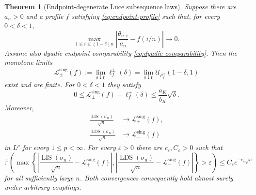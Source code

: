 \documentclass[11pt]{article}
\newtheorem{theorem}{Theorem}[section]
\theoremstyle{remark}
\newcommand{\Pp}{\mathbb P}
\newcommand{\LIS}{\operatorname{LIS}}
\newcommand{\LDS}{\operatorname{LDS}}
\newcommand{\eps}{\varepsilon}
\newcommand{\calL}{\mathcal L}
\newcommand{\calU}{\mathcal U}
\newcommand{\abs}[1]{\left|#1\right|}
\begin{document}
\begin{theorem}[Endpoint-degenerate Luce subsequence laws]
\label{thm:endpoint-luce}
Suppose there are $a_n>0$ and a profile $f$ satisfying
\eqref{eq:endpoint-profile} such that, for every $0<\delta<1$,
\begin{equation}\label{eq:interior-profile-conv}
 \max_{1\le i\le(1-\delta)n}
 \abs{\frac{\theta_{n,i}}{a_n}-f(i/n)}
 \longrightarrow0.
\end{equation}
Assume also dyadic endpoint comparability
\eqref{eq:dyadic-comparability}.  Then the monotone limits
\begin{equation}\label{eq:singular-L-def}
        \calL_\pm^{\mathrm{sing}}(f)
        :=\lim_{\delta\downarrow0}\ell_f^{\pm}(\delta)
        =\lim_{\delta\downarrow0}
          \calU_{\rho_f^{\pm}}(1-\delta,1)
\end{equation}
exist and are finite.  For $0<\delta<1$ they satisfy
\begin{equation}\label{eq:singular-truncation-rate}
 0\le\calL_\pm^{\mathrm{sing}}(f)-\ell_f^{\pm}(\delta)
 \le\frac{a_K}{b_K}\sqrt\delta.
\end{equation}
Moreover,
\begin{align}
        \frac{\LIS(\sigma_n)}{\sqrt n}
        &\longrightarrow\calL_+^{\mathrm{sing}}(f),
        \label{eq:endpoint-LIS-law}\\
        \frac{\LDS(\sigma_n)}{\sqrt n}
        &\longrightarrow\calL_-^{\mathrm{sing}}(f)
        \label{eq:endpoint-LDS-law}
\end{align}
in $L^p$ for every $1\le p<\infty$.  For every $\eps>0$ there are
$c_\eps,C_\eps>0$ such that
\begin{equation}\label{eq:endpoint-concentration}
 \Pp\left(
 \max\left\{
 \abs{\frac{\LIS(\sigma_n)}{\sqrt n}
       -\calL_+^{\mathrm{sing}}(f)},
 \abs{\frac{\LDS(\sigma_n)}{\sqrt n}
       -\calL_-^{\mathrm{sing}}(f)}
 \right\}>\eps
 \right)
 \le C_\eps e^{-c_\eps\sqrt n}
\end{equation}
for all sufficiently large $n$.  Both convergences consequently hold
almost surely under arbitrary couplings.
\end{theorem}
\end{document}
